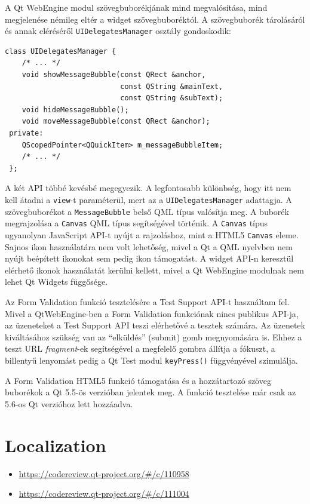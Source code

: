 \documentclass[12pt]{report}
\let\origurl\url
\renewcommand{\url}[1]{%
    \textcolor{blue}{\origurl{#1}}
}
\newcommand{\gerrit}[1]{%
    \textcolor{qtgreen}{\origurl{https://codereview.qt-project.org/\#/c/#1}}
}
\begin{document}
A Qt WebEngine modul szövegbuborékjának mind megvalósítása, mind megjelenése némileg eltér
a widget szövegbuboréktól. A szövegbuborék tárolásáról és annak eléréséről
\texttt{UIDelegatesManager} osztály gondoskodik:
\begin{lstlisting}[title=src/webengine/ui\_delegates\_manager.h]
 class UIDelegatesManager {
    /* ... */
    void showMessageBubble(const QRect &anchor,
                           const QString &mainText,
                           const QString &subText);
    void hideMessageBubble();
    void moveMessageBubble(const QRect &anchor);
 private:
    QScopedPointer<QQuickItem> m_messageBubbleItem;
    /* ... */
 };
\end{lstlisting}
A két API többé kevésbé megegyezik. A legfontosabb különbség, hogy itt nem kell átadni a
\texttt{view}-t paraméterül, mert az a \texttt{UIDelegatesManager} adattagja. A
szövegbuborékot a \texttt{MessageBubble} belső QML típus valósítja meg. A buborék
megrajzolása a \texttt{Canvas} QML típus segítségével történik. A \texttt{Canvas} típus
ugyanolyan JavaScript API-t nyújt a rajzoláshoz, mint a HTML5 \texttt{Canvas} eleme.
Sajnos ikon használatára nem volt lehetőség, mivel a Qt a QML nyelvben nem nyújt beépített
ikonokat sem pedig ikon támogatást. A widget API-n keresztül elérhető ikonok használatát
kerülni kellett, mivel a Qt WebEngine modulnak nem lehet Qt Widgets függősége.

Az Form Validation funkció tesztelésére a Test Support API-t használtam fel. Mivel a
QtWebEngine-ben a Form Validation funkciónak nincs publikus API-ja, az üzeneteket a Test
Support API teszi elérhetővé a tesztek számára. Az üzenetek kiváltásához szükség van
az ``elküldés'' (submit) gomb megnyomására is. Ehhez a teszt URL \textit{fragment}-ek
segítségével a megfelelő gombra állítja a fókuszt, a billentyű lenyomást pedig a Qt Test
modul \texttt{keyPress()} függvényével szimulálja.

A Form Validation HTML5 funkció támogatása és a hozzátartozó szöveg buborékok a Qt 5.5-ös
verzióban jelentek meg. A funkció tesztelése már csak az 5.6-os Qt verzióhoz lett hozzáadva.


\section{Localization}

\begin{center}
    \begin{reviewbox}
        \begin{itemize}
            \renewcommand{\labelitemi}{\textcolor{qtgreen}{$\blacktriangleright$}}
            \item \gerrit{110958}
            \item \gerrit{111004}
        \end{itemize}
    \end{reviewbox}
\end{center}
\end{document}
